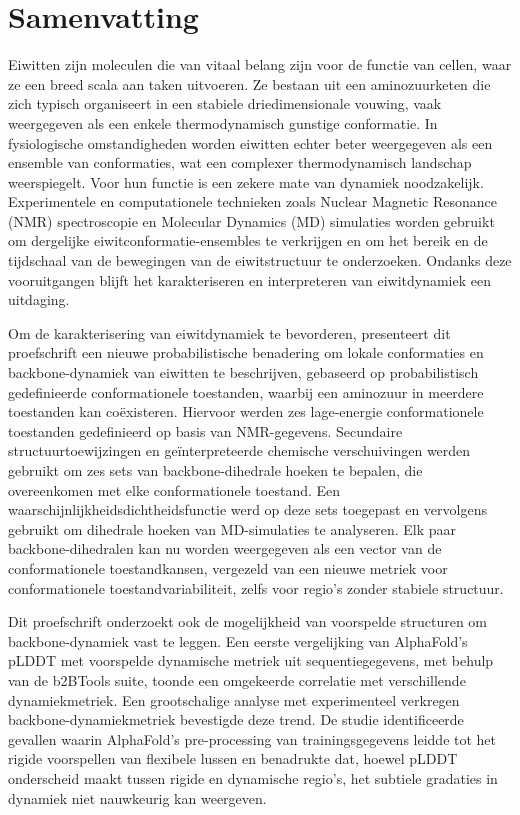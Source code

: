 \chapter*{Samenvatting}

Eiwitten zijn moleculen die van vitaal belang zijn voor de functie van cellen, waar ze een breed scala aan taken uitvoeren. Ze bestaan uit een aminozuurketen die zich typisch organiseert in een stabiele driedimensionale vouwing, vaak weergegeven als een enkele thermodynamisch gunstige conformatie. In fysiologische omstandigheden worden eiwitten echter beter weergegeven als een ensemble van conformaties, wat een complexer thermodynamisch landschap weerspiegelt. Voor hun functie is een zekere mate van dynamiek noodzakelijk. Experimentele en computationele technieken zoals Nuclear Magnetic Resonance (NMR) spectroscopie en Molecular Dynamics (MD) simulaties worden gebruikt om dergelijke eiwitconformatie-ensembles te verkrijgen en om het bereik en de tijdschaal van de bewegingen van de eiwitstructuur te onderzoeken. Ondanks deze vooruitgangen blijft het karakteriseren en interpreteren van eiwitdynamiek een uitdaging.

Om de karakterisering van eiwitdynamiek te bevorderen, presenteert dit proefschrift een nieuwe probabilistische benadering om lokale conformaties en backbone-dynamiek van eiwitten te beschrijven, gebaseerd op probabilistisch gedefinieerde conformationele toestanden, waarbij een aminozuur in meerdere toestanden kan coëxisteren. Hiervoor werden zes lage-energie conformationele toestanden gedefinieerd op basis van NMR-gegevens. Secundaire structuurtoewijzingen en geïnterpreteerde chemische verschuivingen werden gebruikt om zes sets van backbone-dihedrale hoeken te bepalen, die overeenkomen met elke conformationele toestand. Een waarschijnlijkheidsdichtheidsfunctie werd op deze sets toegepast en vervolgens gebruikt om dihedrale hoeken van MD-simulaties te analyseren. Elk paar backbone-dihedralen kan nu worden weergegeven als een vector van de conformationele toestandkansen, vergezeld van een nieuwe metriek voor conformationele toestandvariabiliteit, zelfs voor regio's zonder stabiele structuur.

Dit proefschrift onderzoekt ook de mogelijkheid van voorspelde structuren om backbone-dynamiek vast te leggen. Een eerste vergelijking van AlphaFold's pLDDT met voorspelde dynamische metriek uit sequentiegegevens, met behulp van de b2BTools suite, toonde een omgekeerde correlatie met verschillende dynamiekmetriek. Een grootschalige analyse met experimenteel verkregen backbone-dynamiekmetriek bevestigde deze trend. De studie identificeerde gevallen waarin AlphaFold's pre-processing van trainingsgegevens leidde tot het rigide voorspellen van flexibele lussen en benadrukte dat, hoewel pLDDT onderscheid maakt tussen rigide en dynamische regio's, het subtiele gradaties in dynamiek niet nauwkeurig kan weergeven.

